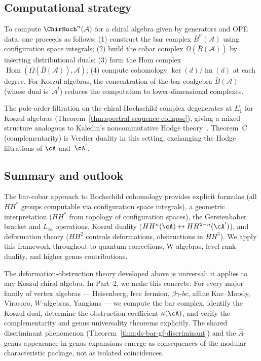 \subsection{Computational strategy}

\begin{remark}\label{rem:compute-HH}
To compute $\ChirHoch^n(\mathcal{A})$ for a chiral algebra given by generators and OPE data, one proceeds as follows: (1) construct the bar complex $\bar{B}^n(\mathcal{A})$ using configuration space integrals; (2) build the cobar complex $\Omega(\bar{B}(\mathcal{A}))$ by inserting distributional duals; (3) form the Hom complex $\operatorname{Hom}(\Omega(\bar{B}(\mathcal{A})), \mathcal{A})$; (4) compute cohomology $\ker(d)/\operatorname{im}(d)$ at each degree. For Koszul algebras, the concentration of the bar coalgebra $\bar{B}(\mathcal{A})$ (whose dual is~$\mathcal{A}^!$) reduces the computation to lower-dimensional complexes.
\end{remark}

\begin{remark}\label{rem:nc-hodge-degeneration}
The pole-order filtration on the chiral Hochschild complex degenerates
at $E_1$ for Koszul algebras
(Theorem~\ref{thm:spectral-sequence-collapse}), giving a mixed
structure analogous to Kaledin's noncommutative Hodge
theory~\cite{Kal08}.  Theorem~C (complementarity) is Verdier duality in
this setting, exchanging the Hodge filtrations of $\cA$ and~$\cA^!$.
\end{remark}

\subsection{Summary and outlook}

The bar-cobar approach to Hochschild cohomology provides explicit formulas
(all $HH^*$ groups computable via configuration space integrals), a geometric
interpretation ($HH^*$ from topology of configuration spaces), the Gerstenhaber
bracket and $L_\infty$ operations, Koszul duality
($HH^n(\cA) \leftrightarrow HH^{2-n}(\cA^!)$), and deformation theory
($HH^2$ controls deformations, obstructions in $HH^3$).
We apply this framework throughout to quantum corrections, W-algebras,
level-rank duality, and higher genus contributions.

\medskip

The deformation-obstruction theory developed above is universal: it applies
to any Koszul chiral algebra.  In Part~2, we make this concrete.  For every
major family of vertex algebras --- Heisenberg, free fermion, $\beta\gamma$-$bc$,
affine Kac--Moody, Virasoro, $W$-algebras, Yangians --- we compute the bar
complex, identify the Koszul dual, determine the obstruction coefficient
$\kappa(\cA)$, and verify the complementarity and genus universality theorems
explicitly.  The shared discriminant phenomenon
(Theorem~\ref{thm:ds-bar-gf-discriminant}) and the $\hat{A}$-genus appearance
in genus expansions emerge as consequences of the modular characteristic
package, not as isolated coincidences.

